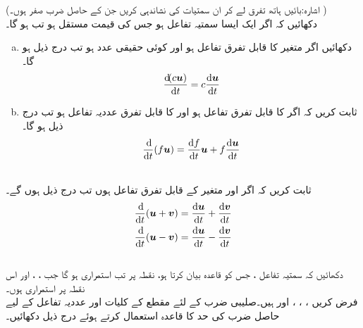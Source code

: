 (اشارہ:بائیں ہاتھ تفرق لے کر ان سمتیات کی نشاندہی کریں جن کے  حاصل ضرب صفر ہوں۔ )
\\
دکھائیں کہ اگر  ایک ایسا سمتیہ  تفاعل ہو جس کی قیمت مستقل  ہو  تب  ہو گا۔
\\
\begin{enumerate}[a.]
\item
دکھائیں اگر  متغیر  کا قابل تفرق تفاعل ہو اور  کوئی حقیقی عدد ہو تب درج ذیل ہو گا۔
\begin{align*}
\frac{\dif(c\kvec{u})}{\dif t}=c\frac{\dif \kvec{u}}{\dif t}
\end{align*}
\item
ثابت کریں کہ  اگر  کا  قابل تفرق تفاعل ہو اور  کا  قابل تفرق  عددیہ  تفاعل ہو تب درج ذیل ہو گا۔
\begin{align*}
\frac{\dif}{\dif t}(f\kvec{u})=\frac{\dif f}{\dif t}\kvec{u}+f\frac{\dif \kvec{u}}{\dif t}
\end{align*}
\end{enumerate}
\\
ثابت کریں کہ اگر  اور  متغیر  کے قابل تفرق تفاعل ہوں تب درج ذیل ہوں  گے۔
\begin{align*}
\frac{\dif}{\dif t}(\kvec{u}+\kvec{v})=\frac{\dif \kvec{u}}{\dif t}+\frac{\dif \kvec{v}}{\dif t}\\
\frac{\dif}{\dif t}(\kvec{u}-\kvec{v})=\frac{\dif \kvec{u}}{\dif t}-\frac{\dif \kvec{v}}{\dif t}
\end{align*}
\\
دکھائیں کہ سمتیہ  تفاعل  ، جس کو قاعدہ  بیان کرتا ہو،  نقطہ  پر تب استمراری ہو گا جب ، ،  اور  اس نقطہ پر استمراری ہوں۔
\\
فرض کریں ،    ،  ،   اور  ہیں۔صلیبی ضرب کے لئے   مقطع  کے کلیات اور عددیہ تفاعل کے لیے  حاصل ضرب  کی حد کا قاعدہ   استعمال کرتے ہوئے  درج ذیل دکھائیں۔
